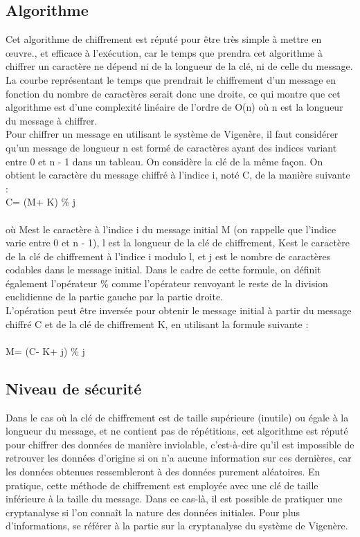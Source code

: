 		\subsection{Algorithme}
			Cet algorithme de chiffrement est réputé pour être très simple à mettre en \oe{uvre.}, et efficace à l'exécution, car le temps que prendra cet algorithme à chiffrer un caractère ne dépend ni de la longueur de la clé, ni de celle du message. La courbe représentant le temps que prendrait le chiffrement d'un message en fonction du nombre de caractères serait donc une droite, ce qui montre que cet algorithme est d'une complexité linéaire de l'ordre de O(n) où n est la longueur du message à chiffrer.\\
			Pour chiffrer un message en utilisant le système de Vigenère, il faut considérer qu'un message de longueur n est formé de caractères ayant des indices variant entre 0 et n - 1 dans un tableau. On considère la clé de la même façon. On obtient le caractère du message chiffré à l'indice i, noté C\rbrack, de la manière suivante :\linebreak
			\\
			C\rbrack = (M\rbrack + K\rbrack) \% j\\
			\\
			où M\rbrack est le caractère à l'indice i du message initial M (on rappelle que l'indice varie entre 0 et n - 1), l est la longueur de la clé de chiffrement, K\rbrack est le caractère de la clé de chiffrement à l'indice i modulo l, et j est le nombre de caractères codables dans le message initial. Dans le cadre de cette formule, on définit également l'opérateur \% comme l'opérateur renvoyant le reste de la division euclidienne de la partie gauche par la partie droite.\\
			L'opération peut être inversée pour obtenir le message initial à partir du message chiffré C et de la clé de chiffrement K, en utilisant la formule suivante :\\
			\\
			M\rbrack = (C\rbrack - K\rbrack + j) \% j
		\subsection{Niveau de sécurité}
			Dans le cas où la clé de chiffrement est de taille supérieure (inutile) ou égale à la longueur du message, et ne contient pas de répétitions, cet algorithme est réputé pour chiffrer des données de manière inviolable, c'est-à-dire qu'il est impossible de retrouver les données d'origine si on n'a aucune information sur ces dernières, car les données obtenues ressembleront à des données purement aléatoires. En pratique, cette méthode de chiffrement est employée avec une clé de taille inférieure à la taille du message. Dans ce cas-là, il est possible de pratiquer une cryptanalyse si l'on connaît la nature des données initiales. Pour plus d'informations, se référer à la partie sur la cryptanalyse du système de Vigenère.
